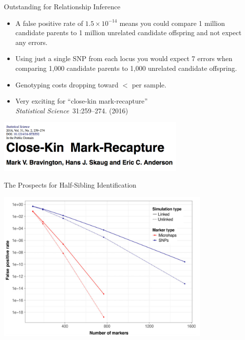 \documentclass[letter,graphicx]{beamer}
\begin{document}
\begin{frame}{Outstanding for Relationship Inference}
\begin{itemize}
\item A false positive rate of $1.5 \times 10^{-14}$ means you could compare 1 million candidate parents to 1 million unrelated candidate offspring and not expect any errors.
\item Using just a single SNP from each locus you would expect 7 errors when comparing 1,000 candidate parents to 1,000 unrelated candidate offspring.
\item Genotyping costs dropping toward $<$ per sample.
\item Very exciting for ``close-kin mark-recapture''\\
{\em Statistical Science}~31:259--274. (2016)
\end{itemize}
\begin{center}
\includegraphics[width = 0.7\textwidth]{mhap_figs/ckmr-header.png}
\end{center}
\end{frame}




\begin{frame}{The Prospects for Half-Sibling Identification}
\begin{center}
\includegraphics[width = 0.8\textwidth]{../figures/linked-power.png}
\end{center}
\end{frame}
\end{document}

